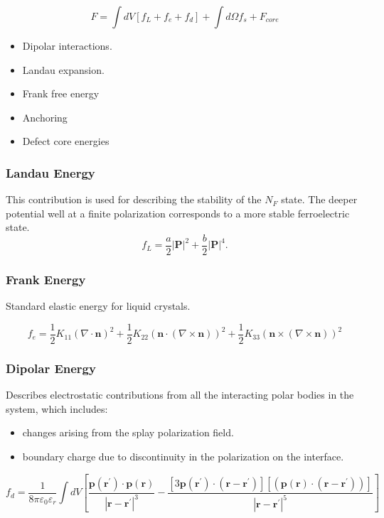 \documentclass{article}
\begin{document}
\begin{equation}
    F = \int dV\left[ f_L + f_e + f_d\right] + \int d\Omega f_s + F_{core}
\end{equation}

\begin{itemize}
    \item Dipolar interactions.
    \item Landau expansion.
    \item Frank free energy
    \item Anchoring
    \item Defect core energies
\end{itemize}
\subsubsection{Landau Energy}
This contribution is used for describing the stability of the $N_{F}$ state. The deeper potential well at a finite polarization corresponds to a more stable ferroelectric state.
\begin{equation}
    f_{L} = \frac{a}{2}|\mathbf{P}|^2+\frac{b}{2}|\mathbf{P}|^4.
\end{equation}

\subsubsection{Frank Energy}
Standard elastic energy for liquid crystals.

\begin{equation}
    f_{e} = \frac{1}{2}K_{11}(\nabla\cdot\mathbf{n})^2+\frac{1}{2}K_{22}(\mathbf{n}\cdot(\nabla\times\mathbf{n}))^2 + \frac{1}{2}K_{33}(\mathbf{n}\times(\nabla\times\mathbf{n}))^2
\end{equation}

\subsubsection{Dipolar Energy}
Describes electrostatic contributions from all the interacting polar bodies in the system, which includes:
\begin{itemize}
    \item changes arising from the splay polarization field.
    \item boundary charge due to discontinuity in the polarization on the interface.
\end{itemize}

\begin{equation}
    f_{d} =\frac{1}{8\pi\varepsilon_0\varepsilon_{r}}\int dV\left[ \frac{\mathbf{p}(\mathbf{r}^{\prime})\cdot\mathbf{p}(\mathbf{r})}{|\mathbf{r}-\mathbf{r}^{\prime}|^3} - \frac{[3\mathbf{p}(\mathbf{r}^{\prime})\cdot(\mathbf{r}-\mathbf{r}^\prime)][(\mathbf{p}(\mathbf{r})\cdot(\mathbf{r}-\mathbf{r}^\prime))]}{|\mathbf{r}-\mathbf{r}^{\prime}|^5}\right]
\end{equation}
\end{document}
